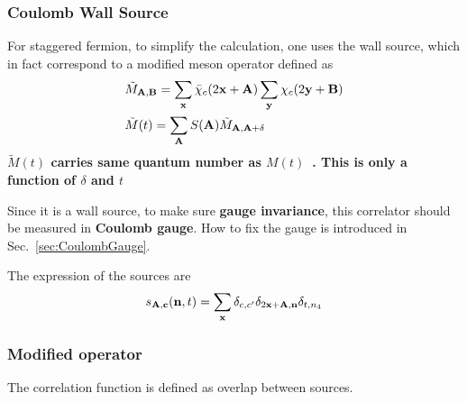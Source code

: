 \subsubsection{\label{CoulombWallSource}Coulomb Wall Source}

For staggered fermion, to simplify the calculation, one uses the wall source, which in fact correspond to a modified meson operator defined as
\begin{equation}
\begin{split}
&\tilde{M}_{{\bf A},{\bf B}}= \sum _{\bf x}\bar{\chi}_c(2{\bf x}+{\bf A}) \sum _{\bf y}\chi _c (2{\bf y}+{\bf B})\\
&\tilde{M}(t) = \sum _{\bf A} S({\bf A})\tilde{M}_{{\bf A},{\bf A}+\delta}
\end{split}
\end{equation}
\textbf{\textcolor[rgb]{0,0,1}{$\tilde{M}(t)$ carries same quantum number as $M(t)$~\cite{staggeredMeson}. This is only a function of $\delta$ and $t$}}

Since it is a wall source, to make sure \textbf{gauge invariance}, this correlator should be measured in \textcolor[rgb]{0,0,1}{\textbf{Coulomb gauge}}. How to fix the gauge is introduced in Sec.~\ref{sec:CoulombGauge}.

The expression of the sources are
\begin{equation}
\begin{split}
&s_{\bf A,c}({\bf n}, t) = \sum _{{\bf x}} \delta _{c,c'}\delta _{2{\bf x}+{\bf A},{\bf n}}\delta _{t,n_4}\\
\end{split}
\end{equation}

\subsubsection{\label{ModifiedOperator}Modified operator}

The correlation function is defined as overlap between sources.

